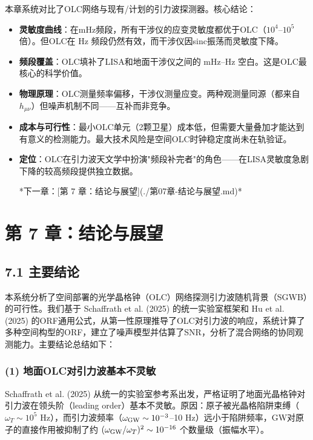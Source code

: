 \documentclass[12pt,a4paper]{article}
\begin{document}
本章系统对比了OLC网络与现有/计划的引力波探测器。核心结论：

\begin{itemize}
  \item[1] \textbf{灵敏度曲线}：在mHz频段，所有干涉仪的应变灵敏度都优于OLC（$10^4$–$10^5$ 倍）。但OLC在 Hz 频段仍然有效，而干涉仪因sinc振荡而灵敏度下降。

  \item[2] \textbf{频段覆盖}：OLC填补了LISA和地面干涉仪之间的 mHz–Hz 空白。这是OLC最核心的科学价值。

  \item[3] \textbf{物理原理}：OLC测量频率偏移，干涉仪测量应变。两种观测量同源（都来自 $h_{\mu\nu}$）但噪声机制不同——互补而非竞争。

  \item[4] \textbf{成本与可行性}：最小OLC单元（2颗卫星）成本低，但需要大量叠加才能达到有意义的检测能力。最大技术风险是空间OLC时钟稳定度尚未在轨验证。

  \item[5] \textbf{定位}：OLC在引力波天文学中扮演"频段补完者"的角色——在LISA灵敏度急剧下降的较高频段提供独立数据。


*下一章：[第 7 章：结论与展望](./第07章-结论与展望.md)*

\end{itemize}
\section{第 7 章：结论与展望}


\subsection{7.1 主要结论}


本系统分析了空间部署的光学晶格钟（OLC）网络探测引力波随机背景（SGWB）的可行性。我们基于 Schaffrath et al. (2025) 的统一实验室框架和 Hu et al. (2025) 的ORF通用公式，从第一性原理推导了OLC对引力波的响应，系统计算了多种空间构型的ORF，建立了噪声模型并估算了SNR，分析了混合网络的协同观测能力。主要结论总结如下：

\subsubsection{(1) 地面OLC对引力波基本不灵敏}


Schaffrath et al. (2025) 从统一的实验室参考系出发，严格证明了地面光晶格钟对引力波在领头阶（leading order）基本不灵敏。原因：原子被光晶格陷阱束缚（$\omega_T \sim 10^5$ Hz），而引力波频率（$\omega_{\rm GW} \sim 10^{-3}$–10 Hz）远小于陷阱频率，GW对原子的直接作用被抑制了约 $(\omega_{\rm GW}/\omega_T)^2 \sim 10^{-16}$ 个数量级（振幅水平）。
\end{document}
